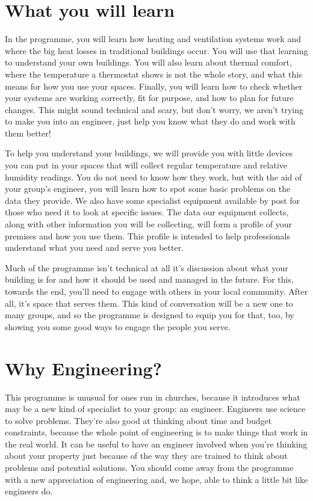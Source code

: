 \documentclass[letterpaper,10pt,english]{jupyterBook}
\begin{document}
\chapter{What you will learn}
\label{\detokenize{learning:what-you-will-learn}}\label{\detokenize{learning::doc}}
\sphinxAtStartPar
In the programme, you will learn how heating and ventilation systems work and where the big heat losses in traditional buildings occur. You will use that learning to understand your own buildings.  You will also learn about thermal comfort, where the temperature a thermostat shows is not the whole story, and what this means for how you use your spaces. Finally, you will learn how to check whether your systems are working correctly, fit for purpose, and how to plan for future changes.  This might sound technical and scary, but don’t worry, we aren’t trying to make you into an engineer, just help you know what they do and work with them better!

\sphinxAtStartPar
To help you understand your buildings, we will provide you with little devices you can put in your spaces that will collect regular temperature and relative humidity readings.  You do not need to know how they work, but with the aid of your group’s engineer, you will learn how to spot some basic problems on the data they provide.  We also have some specialist equipment available by post for those who need it to look at specific issues.  The data our equipment collects, along with other information you will be collecting, will form a profile of your premises and how you use them.  This profile is intended to help professionals understand what you need and serve you better.

\sphinxAtStartPar
Much of the programme isn’t technical at all \sphinxhyphen{} it’s discussion about what your building is for and how it should be used and managed in the future.  For this, towards the end, you’ll need to engage with others in your local community.  After all, it’s space that serves them.  This kind of conversation will be a new one to many groups, and so the programme is designed to equip you for that, too, by showing you some good ways to engage the people you serve.


\chapter{Why Engineering?}
\label{\detokenize{why-engineering:why-engineering}}\label{\detokenize{why-engineering::doc}}
\sphinxAtStartPar
This programme is unusual for ones run in churches, because it introduces what may be a new kind of specialist to your group: an engineer.  Engineers use science to solve problems.  They’re also good at thinking about time and budget constraints, because the whole point of engineering is to make things that work in the real world. It can be useful to have an engineer involved when you’re thinking about your property just because of the way they are trained to think about problems and potential solutions.  You should come away from the programme with a new appreciation of engineering and, we hope, able to think a little bit like engineers do.
\end{document}
